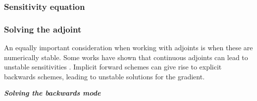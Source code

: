 \subsubsection{Sensitivity equation}

\subsubsection{Solving the adjoint}


An equally important consideration when working with adjoints is when these are numerically stable. 
Some works have shown that continuous adjoints can lead to unstable sensitivities \cite{Jensen_Nakshatrala_Tortorelli_2014}.
Implicit forward schemes can give rise to explicit backwards schemes, leading to unstable solutions for the gradient. 

\vspace*{10px}
\noindent \textbf{\textit{Solving the backwards mode}}
\vspace*{5px}

